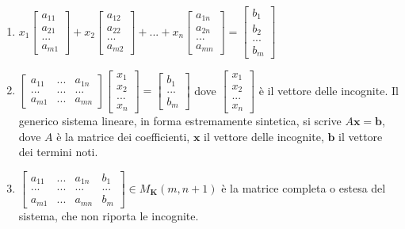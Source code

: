 \documentclass{article}
\begin{document}
\begin{enumerate}
\item $x_{1}\left[ 
\begin{array}{c}
a_{11} \\ 
a_{21} \\ 
... \\ 
a_{m1}%
\end{array}%
\right] +x_{2}\left[ 
\begin{array}{c}
a_{12} \\ 
a_{22} \\ 
... \\ 
a_{m2}%
\end{array}%
\right] +...+x_{n}\left[ 
\begin{array}{c}
a_{1n} \\ 
a_{2n} \\ 
... \\ 
a_{mn}%
\end{array}%
\right] =\left[ 
\begin{array}{c}
b_{1} \\ 
b_{2} \\ 
... \\ 
b_{m}%
\end{array}%
\right] $

\item $\left[ 
\begin{array}{ccc}
a_{11} & ... & a_{1n} \\ 
... & ... & ... \\ 
a_{m1} & ... & a_{mn}%
\end{array}%
\right] \left[ 
\begin{array}{c}
x_{1} \\ 
x_{2} \\ 
... \\ 
x_{n}%
\end{array}%
\right] =\left[ 
\begin{array}{c}
b_{1} \\ 
... \\ 
b_{m}%
\end{array}%
\right] $ dove $\left[ 
\begin{array}{c}
x_{1} \\ 
x_{2} \\ 
... \\ 
x_{n}%
\end{array}%
\right] $ \`{e} il vettore delle incognite. Il generico sistema lineare, in
forma estremamente sintetica, si scrive $A\mathbf{x}=\mathbf{b}$, dove $A$ 
\`{e} la matrice dei coefficienti, $\mathbf{x}$ il vettore delle incognite, $%
\mathbf{b}$ il vettore dei termini noti.

\item $\left[ 
\begin{array}{cccc}
a_{11} & ... & a_{1n} & b_{1} \\ 
... & ... & ... & ... \\ 
a_{m1} & ... & a_{mn} & b_{m}%
\end{array}%
\right] \in M_{\mathbf{K}}\left( m,n+1\right) $ \`{e} la matrice completa o
estesa del sistema, che non riporta le incognite.
\end{enumerate}
\end{document}
